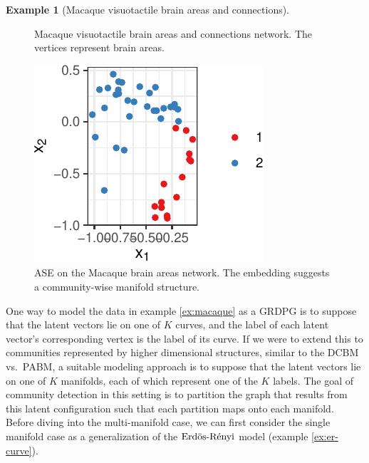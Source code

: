 \documentclass[
  12pt,
]{article}
\theoremstyle{definition}
\theoremstyle{definition}
\newtheorem{example}{Example}[section]
\theoremstyle{definition}
\theoremstyle{definition}
\theoremstyle{remark}
\begin{document}
\begin{example}[Macaque visuotactile brain areas and connections]
\begin{figure}[H]
{}

\caption{Macaque visuotactile brain areas and connections network. The vertices represent brain areas.}\label{fig:macaque-graph}
\end{figure}

\begin{figure}[H]

{\centering \includegraphics{draft_files/figure-latex/macaque-ase-1} 

}

\caption{ASE on the Macaque brain areas network. The embedding suggests a community-wise manifold structure.}\label{fig:macaque-ase}
\end{figure}
\label{macaque}
\end{example}

One way to model the data in example \ref{ex:macaque} as a GRDPG is to suppose that the latent vectors lie on one of \(K\) curves, and the label of each latent vector's corresponding vertex is the label of its curve.
If we were to extend this to communities represented by higher dimensional structures, similar to the DCBM vs.~PABM, a suitable modeling approach is to suppose that the latent vectors lie on one of \(K\) manifolds, each of which represent one of the \(K\) labels.
The goal of community detection in this setting is to partition the graph that results from this latent configuration such that each partition maps onto each manifold.
Before diving into the multi-manifold case, we can first consider the single manifold case as a generalization of the \(\text{Erd\"{o}s-R\'{e}nyi}\) model (example \ref{ex:er-curve}).
\end{document}
